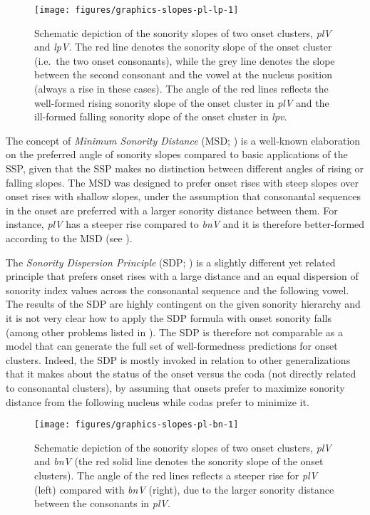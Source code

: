 \begin{figure}
\texttt{[image: figures/graphics-slopes-pl-lp-1]} 
\caption{Schematic depiction of the sonority slopes of two onset clusters, \emph{plV} and \emph{lpV}. The red line denotes the sonority slope of the onset cluster (i.e.~the two onset consonants), while the grey line denotes the slope between the second consonant and the vowel at the nucleus position (always a rise in these cases). The angle of the red lines reflects the well-formed rising sonority slope of the onset cluster in \emph{plV} and the ill-formed falling sonority slope of the onset cluster in \emph{lpv}.}\label{fig:slopes-pl-lp}
\end{figure}

The concept of \emph{Minimum Sonority Distance} (MSD; \citealt{steriade1982greek, selkirk1984majorsk}) is a well-known elaboration on the preferred angle of sonority slopes compared to basic applications of the SSP, given that the SSP makes no distinction between different angles of rising or falling slopes. The MSD was designed to prefer onset rises with steep slopes over onset rises with shallow slopes, under the assumption that consonantal sequences in the onset are preferred with a larger sonority distance between them. For instance, \emph{plV} has a steeper rise compared to \emph{bnV} and it is therefore better-formed according to the MSD (see ).

The \emph{Sonority Dispersion Principle} (SDP; \citealt{clements1990role, clements1992sonority}) is a slightly different yet related principle that prefers onset rises with a large distance and an equal dispersion of sonority index values across the consonantal sequence and the following vowel. The results of the SDP are highly contingent on the given sonority hierarchy and it is not very clear how to apply the SDP formula with onset sonority falls (among other problems listed in \cite[22--24]{parker2002quantifying}). The SDP is therefore not comparable as a model that can generate the full set of well-formedness predictions for onset clusters. Indeed, the SDP is mostly invoked in relation to other generalizations that it makes about the status of the onset versus the coda (not directly related to consonantal clusters), by assuming that onsets prefer to maximize sonority distance from the following nucleus while codas prefer to minimize it.



\begin{figure}
\texttt{[image: figures/graphics-slopes-pl-bn-1]}
\caption{Schematic depiction of the sonority slopes of two onset clusters, \emph{plV} and \emph{bnV} (the red solid line denotes the sonority slope of the onset clusters). The angle of the red lines reflects a steeper rise for \emph{plV} (left) compared with \emph{bnV} (right), due to the larger sonority distance between the consonants in \emph{plV}.}\label{fig:slopes-pl-bn}
\end{figure}

